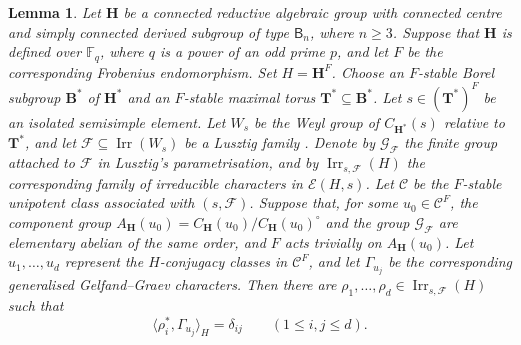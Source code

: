 \documentclass[10pt]{amsart}
\newtheorem{lemma}[theorem]{Lemma}
\theoremstyle{definition}
\renewcommand{\leq}{\leqslant}
\renewcommand{\geq}{\geqslant}
\DeclareMathOperator{\Irr}{Irr}
\numberwithin{equation}{section}
\numberwithin{table}{section}
\begin{document}
\begin{lemma}\label{lem:type-b-isolated-coverage}
Let $\mathbf H$ be a connected reductive algebraic group with connected
centre and simply connected derived subgroup of type $\mathsf B_n$,
where $n\geq3$. Suppose that $\mathbf H$ is defined over
$\mathbb F_q$, where $q$ is a power of an odd prime $p$, and let $F$
be the corresponding Frobenius endomorphism. Set $H=\mathbf H^F$.
Choose an $F$-stable Borel subgroup $\mathbf B^*$ of $\mathbf H^*$
and an $F$-stable maximal torus $\mathbf T^*\subseteq\mathbf B^*$.
Let $s\in(\mathbf T^*)^F$ be an isolated semisimple element.
Let $W_s$ be the Weyl group of $C_{\mathbf H^*}(s)$ relative to
$\mathbf T^*$, and let $\mathcal F\subseteq\Irr(W_s)$ be a Lusztig
family \cite[Definition~4.1.17]{GeckMalle2020}.
Denote by $\mathcal G_{\mathcal F}$ the finite group attached to
$\mathcal F$ in Lusztig's parametrisation, and by
$\Irr_{s,\mathcal F}(H)$ the corresponding family of irreducible
characters in $\mathcal E(H,s)$.
Let $\mathcal C$ be the $F$-stable unipotent class associated with
$(s,\mathcal F)$. Suppose that, for some $u_0\in\mathcal C^F$, the component
group $A_{\mathbf H}(u_0)=C_{\mathbf H}(u_0)/C_{\mathbf H}(u_0)^\circ$
and the group $\mathcal G_{\mathcal F}$ are elementary abelian of the same order,
and $F$ acts trivially on $A_{\mathbf H}(u_0)$.
Let $u_1,\ldots,u_d$ represent the $H$-conjugacy classes in
$\mathcal C^F$, and let $\Gamma_{u_j}$ be the corresponding generalised
Gelfand--Graev characters. Then there are
$\rho_1,\ldots,\rho_d\in\Irr_{s,\mathcal F}(H)$ such that
\begin{equation}\label{eq:type-b-isolated-pairings}
 \langle\rho_i^*,\Gamma_{u_j}\rangle_H=\delta_{ij}
 \qquad(1\leq i,j\leq d).
\end{equation}
\end{lemma}
\end{document}
